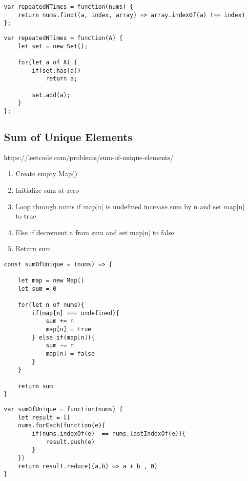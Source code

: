 \documentclass[10pt]{article}
\begin{document}
\begin{lstlisting}[title=Solution repeatedNTimes with ES6, captionpos=t]
var repeatedNTimes = function(nums) {
    return nums.find((a, index, array) => array.indexOf(a) !== index)
};
\end{lstlisting}

\begin{lstlisting}[title=Solution repeatedNTimes with Set(), captionpos=t]
var repeatedNTimes = function(A) {
    let set = new Set();
    
    for(let a of A) {
        if(set.has(a))
            return a;
        
        set.add(a);
    }
};\end{lstlisting}

\medskip %







\pagebreak %
\medskip   
\subsection{Sum of Unique Elements}
https://leetcode.com/problems/sum-of-unique-elements/

\begin{enumerate}
	\item Create empty Map()
	\item Initialize sum at zero 
	\item Loop through nums if map[n] is undefined increase sum by n and set map[n] to true
	\item Else if decrement n from sum and set map[n] to false 
	\item Return sum 
\end{enumerate}

\begin{lstlisting}[title=Solution sumOfUnique with Map(), captionpos=t]
const sumOfUnique = (nums) => {

    let map = new Map()
    let sum = 0
    
    for(let n of nums){
        if(map[n] === undefined){
            sum += n
            map[n] = true
        } else if(map[n]){
            sum -= n
            map[n] = false
        }
    }
    
    return sum
}
\end{lstlisting}

\begin{lstlisting}[title=Solution sumOfUnique with forEach, captionpos=t]
var sumOfUnique = function(nums) {
    let result = []
    nums.forEach(function(e){
        if(nums.indexOf(e)  == nums.lastIndexOf(e)){
            result.push(e)
        } 
    })
    return result.reduce((a,b) => a + b , 0)
}
\end{lstlisting}
\medskip %
\end{document}
